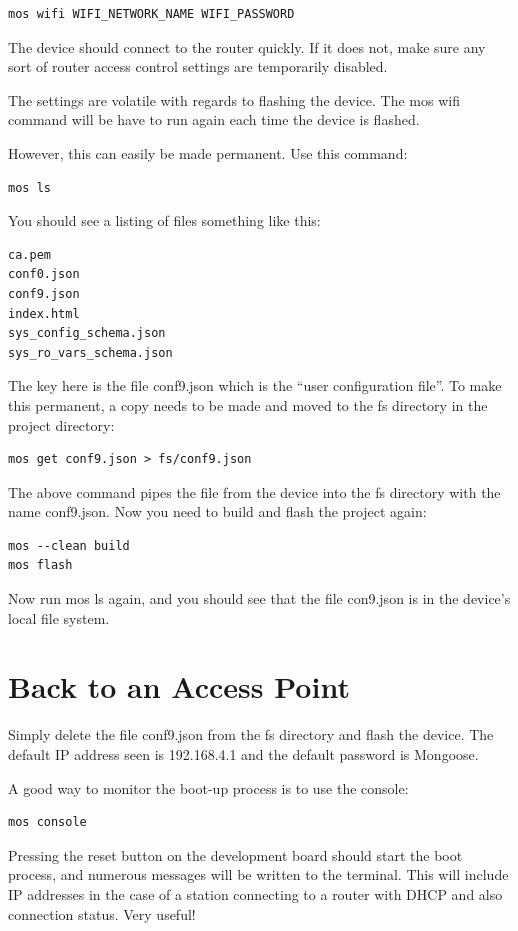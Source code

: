 \documentclass[oneside,letterpaper,12pt]{book}
\begin{document}
\begin{verbatim}
mos wifi WIFI_NETWORK_NAME WIFI_PASSWORD
\end{verbatim}

The device should connect to the router quickly. If it does not, make
sure any sort of router access control settings are temporarily
disabled.

The settings are volatile with regards to flashing the device. The mos
wifi command will be have to run again each time the device is flashed.

However, this can easily be made permanent. Use this command:

\begin{verbatim}
mos ls
\end{verbatim}

You should see a listing of files something like this:

\begin{verbatim}
ca.pem
conf0.json
conf9.json
index.html
sys_config_schema.json
sys_ro_vars_schema.json
\end{verbatim}

The key here is the file conf9.json which is the ``user configuration
file''. To make this permanent, a copy needs to be made and moved to the
fs directory in the project directory:

\begin{verbatim}
mos get conf9.json > fs/conf9.json
\end{verbatim}

The above command pipes the file from the device into the fs directory
with the name conf9.json. Now you need to build and flash the project
again:

\begin{verbatim}
mos --clean build
mos flash
\end{verbatim}

Now run mos ls again, and you should see that the file con9.json is in
the device's local file system.

\section{Back to an Access Point}\label{back-to-an-access-point}

Simply delete the file conf9.json from the fs directory and flash the
device. The default IP address seen is 192.168.4.1 and the default
password is Mongoose.

A good way to monitor the boot-up process is to use the console:

\begin{verbatim}
mos console
\end{verbatim}

Pressing the reset button on the development board should start the boot
process, and numerous messages will be written to the terminal. This
will include IP addresses in the case of a station connecting to a
router with DHCP and also connection status. Very useful!
\end{document}
